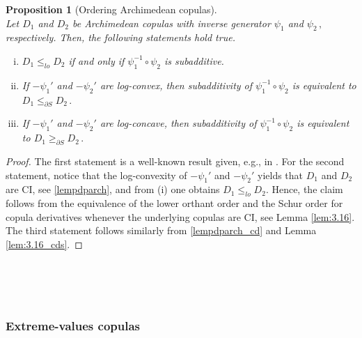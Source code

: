 \documentclass{article}
\newtheorem{proposition}[theorem]{Proposition}
\begin{document}
\begin{proposition}[Ordering Archimedean copulas]\label{prop_ord_arch_cop}~\\
    Let \(D_1\) and \(D_2\) be Archimedean copulas with inverse generator \(\psi_1\) and \(\psi_2\,,\) respectively.
    Then, the following statements hold true.
    \begin{enumerate}[(i)]
        \item \label{ord_arch_cop_1} \(D_1\leq_{lo} D_2\) if and only if \(\psi^{-1}_1\circ \psi_2\) is subadditive.
        \item If \(-\psi_1'\) and \(-\psi_2'\) are log-convex, then subadditivity of \(\psi_1^{-1}\circ \psi_2\) is equivalent to \(D_1\leq_{\partial S} D_2\,.\)
        \item If \(-\psi_1'\) and \(-\psi_2'\) are log-concave, then subadditivity of \(\psi_1^{-1}\circ \psi_2\) is equivalent to \(D_1\geq_{\partial S} D_2\,.\)
    \end{enumerate}
\end{proposition}

\begin{proof}
    The first statement is a well-known result given, e.g., in \cite[Theorem 4.4.2]{Nelsen-2006}.
    For the second statement, notice that the log-convexity of \(-\psi_1'\) and \(-\psi_2'\) yields that $D_1$ and $D_2$ are CI, see \eqref{lempdparch}, and from (i) one obtains $D_1\leq_{lo} D_2$.
    Hence, the claim follows from the equivalence of the lower orthant order and the Schur order for copula derivatives whenever the underlying copulas are CI, see Lemma \ref{lem:3.16}.
    The third statement follows similarly from \eqref{lempdparch_cd} and Lemma \ref{lem:3.16_cds}.
\end{proof}

~\\
~\\
~\\
\subsubsection{Extreme-values copulas}\label{secdeppropEVC}
\end{document}
